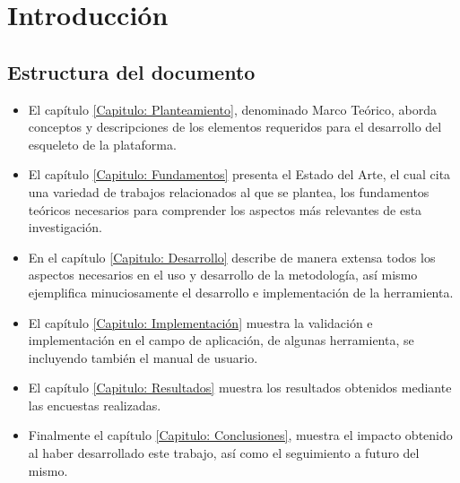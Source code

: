 \chapter*{Introducción}

\begin{large}
\onehalfspacing %


\section*{Estructura del documento}

\begin{itemize}
    \item El capítulo \ref{Capitulo: Planteamiento}, denominado Marco Teórico, aborda conceptos y descripciones de los elementos requeridos para el desarrollo del esqueleto de la plataforma.
    \item El capítulo \ref{Capitulo: Fundamentos} presenta el Estado del Arte, el cual cita una variedad de trabajos relacionados al que se plantea, los fundamentos teóricos necesarios para comprender los aspectos más relevantes de esta investigación.
    \item En el capítulo \ref{Capitulo: Desarrollo} describe de manera extensa todos los aspectos necesarios en el uso y desarrollo de la metodología, así mismo ejemplifica minuciosamente el desarrollo e implementación de la herramienta.
    \item El capítulo \ref{Capitulo: Implementación} muestra la validación e implementación en el campo de aplicación, de algunas herramienta, se incluyendo también el manual de usuario.
    \item El capítulo \ref{Capitulo: Resultados} muestra los resultados obtenidos mediante las encuestas realizadas.
    \item Finalmente el capítulo \ref{Capitulo: Conclusiones}, muestra el impacto obtenido al haber desarrollado este trabajo, así como el seguimiento a futuro del mismo.
\end{itemize} \leavevmode

\end{large}
\newpage
